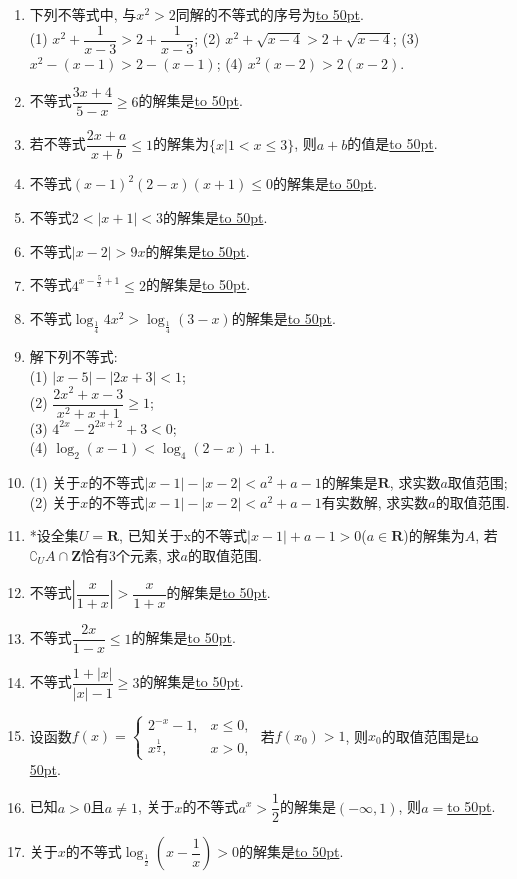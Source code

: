 \documentclass[10pt,a4paper]{article}
\newcommand{\blank}[1]{\underline{\hbox to #1pt{}}}
\begin{document}
\begin{enumerate}[1.]
\item 下列不等式中, 与$x^2>2$同解的不等式的序号为\blank{50}.\\
(1) $x^2+\dfrac 1{x-3}>2+\dfrac 1{x-3}$;  (2) $x^2+\sqrt{x-4}>2+\sqrt{x-4}$; (3) $x^2-(x-1)>2-(x-1)$; (4) $x^2(x-2)>2(x-2)$.
\item 不等式$\dfrac{3x+4}{5-x}\ge 6$的解集是\blank{50}.
\item 若不等式$\dfrac{2x+a}{x+b}\le 1$的解集为$\{x|1<x\le 3\}$, 则$a+b$的值是\blank{50}.
\item 不等式$(x-1)^2(2-x)(x+1)\le 0$的解集是\blank{50}.
\item 不等式$2<|x+1|<3$的解集是\blank{50}.
\item 不等式$|x-2|>9x$的解集是\blank{50}.
\item 不等式$4^{x-\frac 5x+1}\le 2$的解集是\blank{50}.
\item 不等式$\log_{\frac 14}4{x^2}>\log_{\frac 14}(3-x)$的解集是\blank{50}.
\item 解下列不等式:\\
(1) $|x-5|-|2x+3|<1$;\\
(2) $\dfrac{2x^2+x-3}{x^2+x+1}\ge 1$;\\
(3) $4^{2x}-2^{2x+2}+3<0$;\\
(4) $\log_2(x-1)<\log_4(2-x)+1$.
\item (1) 关于$x$的不等式$|x-1|-|x-2|<a^2+a-1$的解集是$\mathbf{R}$, 求实数$a$取值范围;\\
(2) 关于$x$的不等式$|x-1|-|x-2|<a^2+a-1$有实数解, 求实数$a$的取值范围.
\item *设全集$U=\mathbf{R}$, 已知关于x的不等式$|x-1|+a-1>0$($a\in \mathbf{R}$)的解集为$A$, 若$\complement_U A\cap \mathbf{Z}$恰有$3$个元素, 求$a$的取值范围.
\item 不等式$|\dfrac x{1+x}|>\dfrac x{1+x}$的解集是\blank{50}.
\item 不等式$\dfrac{2x}{1-x}\le 1$的解集是\blank{50}.
\item 不等式$\dfrac{1+|x|}{|x|-1}\ge 3$的解集是\blank{50}.
\item 设函数$f(x)=\begin{cases} 2^{-x}-1, & x\le 0, \\ x^{\frac 12}, & x>0, \end{cases}$ 若$f(x_0)>1$, 则$x_0$的取值范围是\blank{50}.
\item 已知$a>0$且$a\ne 1$, 关于$x$的不等式$a^x>\dfrac 12$的解集是$(-\infty ,1)$, 则$a=$\blank{50}.
\item 关于$x$的不等式$\log_{\frac 12}(x-\dfrac 1x)>0$的解集是\blank{50}.

\end{enumerate}
\end{document}
